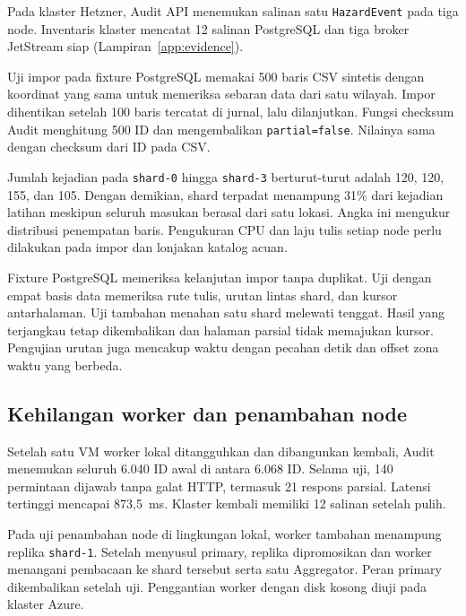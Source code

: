 Pada klaster Hetzner, Audit API menemukan salinan satu \texttt{HazardEvent} pada tiga node. Inventaris klaster mencatat 12 salinan PostgreSQL dan tiga broker JetStream siap (Lampiran~\ref{app:evidence}).

Uji impor pada fixture PostgreSQL memakai 500 baris CSV sintetis dengan koordinat yang sama untuk memeriksa sebaran data dari satu wilayah. Impor dihentikan setelah 100 baris tercatat di jurnal, lalu dilanjutkan. Fungsi checksum Audit menghitung 500 ID dan mengembalikan \texttt{partial=false}. Nilainya sama dengan checksum dari ID pada CSV.


Jumlah kejadian pada \texttt{shard-0} hingga \texttt{shard-3} berturut-turut adalah 120, 120, 155, dan 105. Dengan demikian, shard terpadat menampung 31\% dari kejadian latihan meskipun seluruh masukan berasal dari satu lokasi. Angka ini mengukur distribusi penempatan baris. Pengukuran CPU dan laju tulis setiap node perlu dilakukan pada impor dan lonjakan katalog acuan.

Fixture PostgreSQL memeriksa kelanjutan impor tanpa duplikat. Uji dengan empat basis data memeriksa rute tulis, urutan lintas shard, dan kursor antarhalaman. Uji tambahan menahan satu shard melewati tenggat. Hasil yang terjangkau tetap dikembalikan dan halaman parsial tidak memajukan kursor. Pengujian urutan juga mencakup waktu dengan pecahan detik dan offset zona waktu yang berbeda.

\subsection{Kehilangan worker dan penambahan node}

Setelah satu VM worker lokal ditangguhkan dan dibangunkan kembali, Audit menemukan seluruh 6.040 ID awal di antara 6.068 ID. Selama uji, 140 permintaan dijawab tanpa galat HTTP, termasuk 21 respons parsial. Latensi tertinggi mencapai 873{,}5~ms. Klaster kembali memiliki 12 salinan setelah pulih.

Pada uji penambahan node di lingkungan lokal, worker tambahan menampung replika \texttt{shard-1}. Setelah menyusul primary, replika dipromosikan dan worker menangani pembacaan ke shard tersebut serta satu Aggregator. Peran primary dikembalikan setelah uji. Penggantian worker dengan disk kosong diuji pada klaster Azure.

